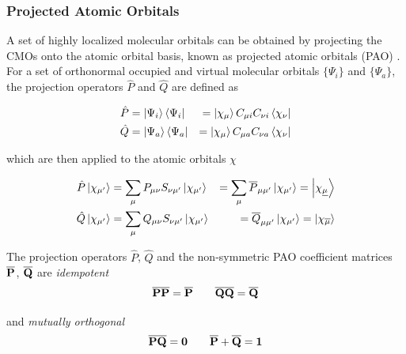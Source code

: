 
\subsubsection{Projected Atomic Orbitals \label{sec:PAO}}

A set of highly localized molecular orbitals can be obtained by projecting the CMOs onto the atomic orbital basis, known as projected atomic orbitals (PAO) \cite{Sae1993}. For a set of orthonormal occupied and virtual molecular orbitals $\{\Psi_i\}$ and $\{\Psi_a\}$, the projection operators $\hat{P}$ and $\hat{Q}$ are defined as \cite{Chr2006}

\begin{eqnarray}
\hat{P} &= \ket{\Psi_i} \bra{\Psi_i} &= \ket{\chi_{\mu}} C_{\mu i} C_{\nu i} \bra{\chi_{\nu}} \\
\hat{Q} &= \ket{\Psi_a} \bra{\Psi_a} &= \ket{\chi_{\mu}} C_{\mu a} C_{\nu a} \bra{\chi_{\nu}}
\end{eqnarray}

\noindent which are then applied to the atomic orbitals $\chi$ 

\begin{eqnarray}
\hat{P} \ket{\chi_{\mu'}} &= \sum_{\mu} P_{\mu\nu} S_{\nu\mu'} \ket{\chi_{\mu'}} &= \sum_{\mu} \overline{P}_{\mu \mu'} \ket{\chi_{\mu'}} = \ket{\chi_{\underline{\mu}}} \\
\hat{Q} \ket{\chi_{\mu'}} &= \sum_{\mu} Q_{\mu\nu} S_{\nu\mu'} \ket{\chi_{\mu'}}  &= \overline{Q}_{\mu \mu'} \ket{\chi_{\mu'}} = \ket{\chi_{\overline{\mu}}}
\end{eqnarray} 

The projection operators $\hat{P}$, $\hat{Q}$ and the non-symmetric PAO coefficient matrices $\mathbf{\overline{P}}$, $\mathbf{\overline{Q}}$ are \emph{idempotent}
\begin{equation}
\mathbf{\overline{P}}\mathbf{\overline{P}} = \mathbf{\overline{P}} \qquad
\mathbf{\overline{Q}}\mathbf{\overline{Q}} = \mathbf{\overline{Q}}
\end{equation}

\noindent and \emph{mutually orthogonal} 
\begin{equation}
\mathbf{\overline{P}}\mathbf{\overline{Q}} = \mathbf{0} \qquad \mathbf{\overline{P}} + \mathbf{\overline{Q}} = \mathbf{1} 
\end{equation} 

